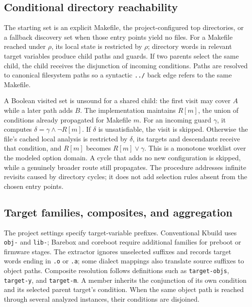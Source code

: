 \documentclass[acmsmall,screen,review]{acmart}
\begin{document}
\subsection{Conditional directory reachability}
\label{sec:design:worklist}
The starting set is an explicit Makefile, the project-configured top directories, or a fallback discovery set when those entry points yield no files. For a Makefile reached under $\rho$, its local state is restricted by $\rho$; directory words in relevant target variables produce child paths and guards. If two parents select the same child, the child receives the disjunction of incoming conditions. Paths are resolved to canonical filesystem paths so a syntactic \texttt{../} back edge refers to the same Makefile.

A Boolean visited set is unsound for a shared child: the first visit may cover $A$ while a later path adds $B$. The implementation maintains $R[m]$, the union of conditions already propagated for Makefile $m$. For an incoming guard $\gamma$, it computes $\delta=\gamma\land\neg R[m]$. If $\delta$ is unsatisfiable, the visit is skipped. Otherwise the file's cached local analysis is restricted by $\delta$, its targets and descendants receive that condition, and $R[m]$ becomes $R[m]\lor\gamma$. This is a monotone worklist over the modeled option domain. A cycle that adds no new configuration is skipped, while a genuinely broader route still propagates. The procedure addresses infinite revisits caused by directory cycles; it does not add selection rules absent from the chosen entry points.



\subsection{Target families, composites, and aggregation}
\label{sec:design:targets}
The project settings specify target-variable prefixes. Conventional Kbuild uses \texttt{obj-} and \texttt{lib-}; Barebox and coreboot require additional families for preboot or firmware stages. The extractor ignores unselected suffixes and records target words ending in \texttt{.o} or \texttt{.a}; some dialect mappings also translate source suffixes to object paths. Composite resolution follows definitions such as \texttt{target-objs}, \texttt{target-y}, and \texttt{target-m}. A member inherits the conjunction of its own condition and its selected parent target's condition. When the same object path is reached through several analyzed instances, their conditions are disjoined.
\end{document}
